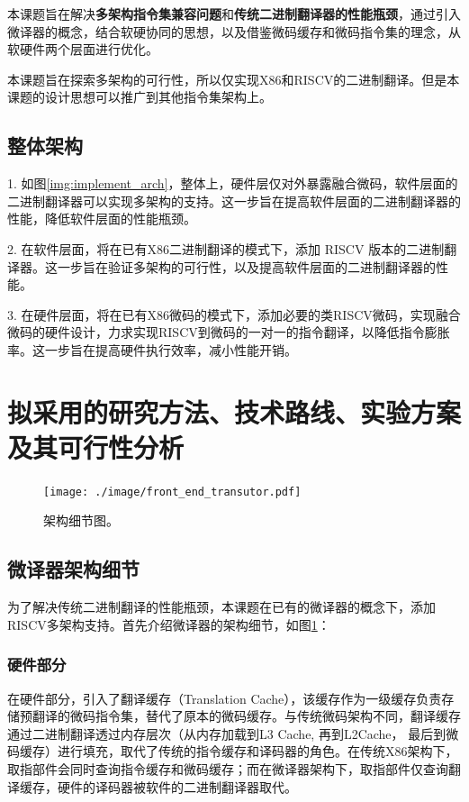 \documentclass{Style/ucasproposal}%
\begin{document}
本课题旨在解决\textbf{多架构指令集兼容问题}和\textbf{传统二进制翻译器的性能瓶颈}，通过引入微译器的概念，结合软硬协同的思想，以及借鉴微码缓存和微码指令集的理念，从软硬件两个层面进行优化。

本课题旨在探索多架构的可行性，所以仅实现X86和RISCV的二进制翻译。但是本课题的设计思想可以推广到其他指令集架构上。

\subsection{整体架构}
1. 如图\ref{img:implement_arch}，整体上，硬件层仅对外暴露融合微码，软件层面的二进制翻译器可以实现多架构的支持。这一步旨在提高软件层面的二进制翻译器的性能，降低软件层面的性能瓶颈。

2. 在软件层面，将在已有X86二进制翻译的模式下，添加 RISCV 版本的二进制翻译器。这一步旨在验证多架构的可行性，以及提高软件层面的二进制翻译器的性能。

3. 在硬件层面，将在已有X86微码的模式下，添加必要的类RISCV微码，实现融合微码的硬件设计，力求实现RISCV到微码的一对一的指令翻译，以降低指令膨胀率。这一步旨在提高硬件执行效率，减小性能开销。




\section{拟采用的研究方法、技术路线、实验方案及其可行性分析}

\begin{figure}[h]
  \centering
  \texttt{[image: ./image/front\_end\_transutor.pdf]}
  \caption{架构细节图。}
  \label{img:front_end_transutor}
\end{figure}

\subsection{微译器架构细节}

为了解决传统二进制翻译的性能瓶颈，本课题在已有的微译器的概念下，添加RISCV多架构支持。首先介绍微译器的架构细节，如图\ref{img:front_end_transutor}：

\subsubsection{硬件部分}

在硬件部分，引入了翻译缓存（Translation Cache），该缓存作为一级缓存负责存储预翻译的微码指令集，替代了原本的微码缓存。与传统微码架构不同，翻译缓存通过二进制翻译透过内存层次（从内存加载到L3 Cache, 再到L2Cache， 最后到微码缓存）进行填充，取代了传统的指令缓存和译码器的角色。在传统X86架构下，取指部件会同时查询指令缓存和微码缓存；而在微译器架构下，取指部件仅查询翻译缓存，硬件的译码器被软件的二进制翻译器取代。
\end{document}
